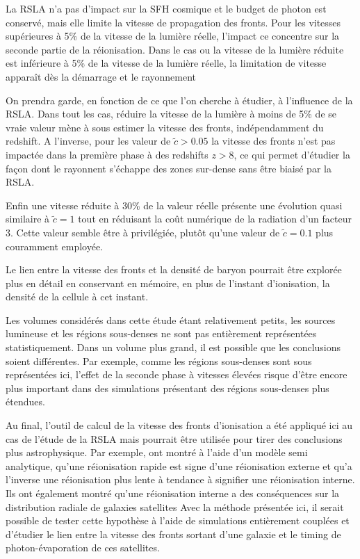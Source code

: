 La \ac{RSLA} n'a pas d'impact sur la \ac{SFH} cosmique et le budget de photon est conservé, mais elle limite la vitesse de propagation des fronts.
Pour les vitesses supérieures à 5\% de la vitesse de la lumière réelle, l'impact ce concentre sur la seconde partie de la réionisation.
Dans le cas ou la vitesse de la lumière réduite est inférieure à 5\% de la vitesse de la lumière réelle, la limitation de vitesse apparaît dès la démarrage et le rayonnement 

On prendra garde, en fonction de ce que l'on cherche à étudier, à l'influence de la \ac{RSLA}.
Dans tout les cas, réduire la vitesse de la lumière à moins de 5\% de se vraie valeur mène à sous estimer la vitesse des fronts, indépendamment du redshift.
A l'inverse, pour les valeur de $\tilde{c} > 0.05$ la vitesse des fronts n'est pas impactée dans la première phase à des redshifts $z>8$, ce qui permet d'étudier la façon dont le rayonnent s’échappe des zones sur-dense sans être biaisé par la \ac{RSLA}.

Enfin une vitesse réduite à 30\% de la valeur réelle présente une évolution quasi similaire à $\tilde{c}=1$ tout en réduisant la coût numérique de la radiation d'un facteur 3.
Cette valeur semble être à privilégiée, plutôt qu'une valeur de $\tilde{c}=0.1$ plus couramment employée.

Le lien entre la vitesse des fronts et la densité de baryon pourrait être explorée plus en détail en conservant en mémoire, en plus de l'instant d'ionisation, la densité de la cellule à cet instant.

Les volumes considérés dans cette étude étant relativement petits, les sources lumineuse et les régions sous-denses ne sont pas entièrement représentées statistiquement.
Dans un volume plus grand, il est possible que les conclusions soient différentes.
Par exemple, comme les régions sous-denses sont sous représentées ici, l'effet de la seconde phase à vitesses élevées risque d'être encore plus important dans des simulations présentant des régions sous-denses plus étendues.

Au final, l'outil de calcul de la vitesse des fronts d'ionisation a été appliqué ici au cas de l'étude de la \ac{RSLA} mais pourrait être utilisée pour tirer des conclusions plus astrophysique.
Par exemple, \citep{2011MNRAS.417L..93O} ont montré à l'aide d'un modèle semi analytique, qu'une réionisation rapide est signe d'une réionisation externe et qu'a l'inverse une réionisation plus lente à tendance à signifier une réionisation interne.
Ils ont également montré qu'une réionisation interne a des conséquences sur la distribution radiale de galaxies satellites 
Avec la méthode présentée ici, il serait possible de tester cette hypothèse à l'aide de simulations entièrement couplées et d'étudier le lien entre la vitesse des fronts sortant d'une galaxie et le timing de photon-évaporation de ces satellites.

